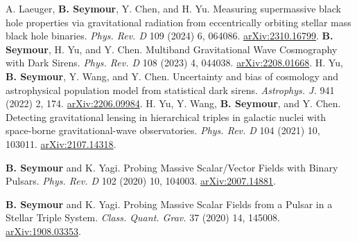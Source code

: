 



\begin{cvpublications}
\cvpublication
        {A. Laeuger, \textbf{B. Seymour}, Y. Chen, and  H. Yu. Measuring supermassive black hole properties via gravitational radiation from eccentrically orbiting stellar mass black hole binaries. 
        \textit{Phys. Rev. D} 109 (2024) 6, 064086.
        \href{https://arxiv.org/abs/2310.16799}{arXiv:2310.16799}.
        } %
    \cvpublication
        {\textbf{B. Seymour}, H. Yu, and Y. Chen. Multiband Gravitational Wave Cosmography with Dark Sirens. 
        \textit{Phys. Rev. D} 108 (2023) 4, 044038.
        \href{https://arxiv.org/abs/2208.01668}{arXiv:2208.01668}.
        } %
    \cvpublication
        {H. Yu, \textbf{B. Seymour}, Y. Wang, and Y. Chen. Uncertainty and bias of cosmology and astrophysical population model from statistical dark sirens.
        \textit{Astrophys. J.} 941 (2022) 2, 174.
        \href{https://arxiv.org/abs/2206.09984}{arXiv:2206.09984}.
        } %
    \cvpublication
        {H. Yu, Y. Wang, \textbf{B. Seymour}, and Y. Chen. Detecting gravitational lensing in hierarchical triples in galactic nuclei with space-borne gravitational-wave observatories.
        \textit{Phys. Rev. D} 104 (2021) 10, 103011.
        \href{https://arxiv.org/abs/2107.14318}{arXiv:2107.14318}.
        } %

    \cvpublication
        {\textbf{B. Seymour} and K. Yagi. Probing Massive Scalar/Vector Fields with Binary Pulsars.
        \textit{Phys. Rev. D} 102 (2020) 10, 104003.
        \href{https://arxiv.org/abs/2007.14881}{arXiv:2007.14881}.
        } %
        

  \cvpublication
    {\textbf{B. Seymour} and K. Yagi. Probing Massive Scalar Fields from a Pulsar in a Stellar Triple System.
    \textit{Class. Quant. Grav.} 37 (2020) 14, 145008.
    \href{https://arxiv.org/abs/1908.03353}{arXiv:1908.03353}. } %
    

\end{cvpublications}
